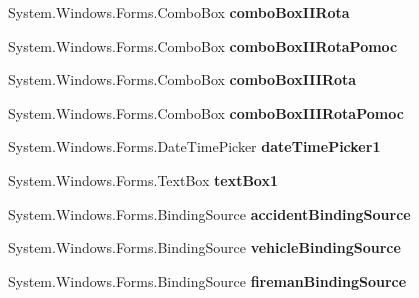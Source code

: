 \begin{DoxyCompactItemize}
System.\+Windows.\+Forms.\+Combo\+Box {\bfseries combo\+Box\+I\+I\+Rota}
\item 
\mbox{\label{class_statystyki___o_s_p_1_1_accident_form_acdae6a26b779c070f760505626303edc}} 
System.\+Windows.\+Forms.\+Combo\+Box {\bfseries combo\+Box\+I\+I\+Rota\+Pomoc}
\item 
\mbox{\label{class_statystyki___o_s_p_1_1_accident_form_a2c7b7ad12324bf5129c51065186691f5}} 
System.\+Windows.\+Forms.\+Combo\+Box {\bfseries combo\+Box\+I\+I\+I\+Rota}
\item 
\mbox{\label{class_statystyki___o_s_p_1_1_accident_form_aaf34337beb76ff0720ffcf22b22f5d52}} 
System.\+Windows.\+Forms.\+Combo\+Box {\bfseries combo\+Box\+I\+I\+I\+Rota\+Pomoc}
\item 
\mbox{\label{class_statystyki___o_s_p_1_1_accident_form_aa21bda9503d9c7c86d10d902902e52cc}} 
System.\+Windows.\+Forms.\+Date\+Time\+Picker {\bfseries date\+Time\+Picker1}
\item 
\mbox{\label{class_statystyki___o_s_p_1_1_accident_form_ae81c1c41ca5b735ba582804d78f438bb}} 
System.\+Windows.\+Forms.\+Text\+Box {\bfseries text\+Box1}
\item 
\mbox{\label{class_statystyki___o_s_p_1_1_accident_form_a45cd9ba75c03fe74b621deb1ff45938c}} 
System.\+Windows.\+Forms.\+Binding\+Source {\bfseries accident\+Binding\+Source}
\item 
\mbox{\label{class_statystyki___o_s_p_1_1_accident_form_ad18b0973e83cdcd1268f824d61052696}} 
System.\+Windows.\+Forms.\+Binding\+Source {\bfseries vehicle\+Binding\+Source}
\item 
\mbox{\label{class_statystyki___o_s_p_1_1_accident_form_a29c49c191280294b126ae635a63e70ef}} 
System.\+Windows.\+Forms.\+Binding\+Source {\bfseries fireman\+Binding\+Source}
\item 
\mbox{\label{class_statystyki___o_s_p_1_1_accident_form_a7589397b441b54cf1ec91fdfdb1387da}} 

\end{DoxyCompactItemize}
